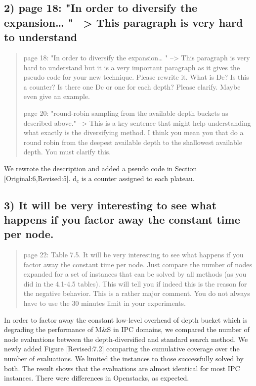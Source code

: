 \documentclass{article}
\begin{document}
\subsection{2) page 18: "In order to diversify the expansion\ldots{} " --> This paragraph is very hard to understand}
\label{sec:orgheadline2}

\begin{quote}
page 18: "In order to diversify the expansion\ldots{} " --> This
paragraph is very hard to understand but it is a very important
paragraph as it gives the pseudo code for your new technique. Please
rewrite it. What is Dc? Is this a counter? Is there one Dc or one for
each depth? Please clarify. Maybe even give an example.

page 20: "round-robin sampling from the available depth buckets as
described above." --> This is a key sentence that might help
understanding what exactly is the diversifying method. I think you
mean you that do a round robin from the deepest available depth to the
shallowest available depth. You must clarify this.
\end{quote}

We rewrote the description and added a pseudo code in Section [Original:6,Revised:5].
d\(_{\text{c}}\) is a counter assigned to each plateau.

\subsection{3) It will be very interesting to see what happens if you factor away the constant time per node.}
\label{sec:orgheadline3}

\begin{quote}
page 22: Table 7.5. It will be very interesting to see what
happens if you factor away the constant time per node. Just compare
the number of nodes expanded for a set of instances that can be solved
by all methods (as you did in the 4.1-4.5 tables). This will tell you
if indeed this is the reason for the negative behavior. This is a
rather major comment. You do not always have to use the 30 minutes
limit in your experiments.
\end{quote}

In order to factor away the constant low-level overhead of depth bucket
which is degrading the performance of M\&S in IPC domains,
we compared the number of node evaluations between the depth-diversified and standard search method.
We newly added Figure [Revised:7.2] comparing the cumulative coverage over the number of evaluations.
We limited the instances to those successfully solved by both.
The result shows that the evaluations are almost identical for most IPC instances.
There were differences in Openstacks, as expected.
\end{document}
